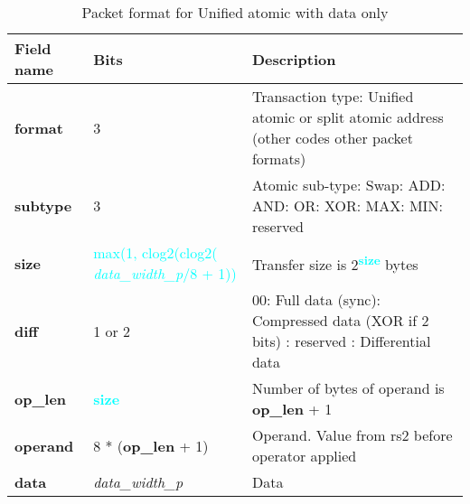 \begin{table}[htp]
  \centering
  \caption{Packet format for Unified atomic with data only}
  \label{tab:te_datadx0y7}
  \begin{tabulary}{\textwidth}{|l|p{38mm}|p{92mm}|}
    \hline
    {\bf Field name} & {\bf Bits} & {\bf Description} \\
    \hline
    \textbf{format} & 	3	& Transaction type: Unified atomic or split atomic address\newline	
		(other codes other packet formats)\\
    \hline
    \textbf{subtype} & 	3	& Atomic sub-type: Swap: ADD: AND: OR: XOR: MAX: MIN: reserved\\	
    \hline
    \textbf{size} & \textcolor{cyan}{max(1, clog2(clog2( \textit{data\_width\_p}/8 + 1))} & Transfer size is 2\textsuperscript{\textcolor{cyan}{\textbf{size}}} bytes\\
    \hline
    \textbf{diff} & 1 or 2 & 00: Full data (sync): Compressed data (XOR if 2 bits) : reserved : Differential data\\
    \hline
    \textbf{op\_len} & \textcolor{cyan}{\textbf{size}} & Number of bytes of operand is \textbf{op\_len} + 1\\
    \hline
    \textbf{operand}	& 8 * (\textbf{op\_len} + 1) & Operand.  Value from rs2 before operator applied\\
    \hline
    \textbf{data} & \textit{data\_width\_p} & 
                Data\\
    \hline
  \end{tabulary}
\end{table}


